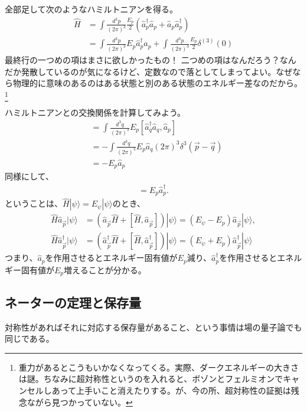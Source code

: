 \documentclass[10pt,a4paper]{jarticle}
\begin{document}
%
全部足して次のようなハミルトニアンを得る。
\begin{align}
\hat H
&= \int \frac{d^3 p}{(2\pi)^3} \frac{E_p}{2}( \hat a_p^\dagger \hat a_p + \hat a_p \hat a_p^\dagger ) \nonumber\\
&= \int \frac{d^3 p}{(2\pi)^3} E_p \hat a_p^\dagger \hat a_p + \int \frac{d^3 p}{(2\pi)^3} \frac{E_p}{2} \delta^{(3)}(0) \label{eq:spin 0 hamiltonian}
\end{align}
最終行の一つめの項はまさに欲しかったもの！
二つめの項はなんだろう？なんだか発散しているのが気になるけど、定数なので落としてしまってよい。なぜなら物理的に意味のあるのはある状態と別のある状態のエネルギー差なのだから。\footnote{
重力があるとこうもいかなくなってくる。実際、ダークエネルギーの大きさは謎。ちなみに超対称性というのを入れると、ボゾンとフェルミオンでキャンセルしあって上手いこと消えたりする。が、今の所、超対称性の証拠は残念ながら見つかっていない。}

ハミルトニアンとの交換関係を計算してみよう。
\begin{align}
[\hat H, \hat a_p]
&=\int \frac{d^3 q}{(2\pi)^3} E_p [\hat a_q^\dagger \hat a_q, \hat a_p] \nonumber\\
&=-\int \frac{d^3 q}{(2\pi)^3} E_p \hat a_q (2\pi)^3 \delta^3(\vec p - \vec q) \nonumber\\
&=-E_p \hat a_p
\end{align}
同様にして、
\begin{align}
[\hat H, \hat a_p^\dagger] = E_p \hat a_p^\dagger.
\end{align}
%
ということは、$\hat H |\psi \rangle = E_\psi |\psi\rangle$のとき、
\begin{align}
\hat H  \hat a_{\vec p} |\psi\rangle &= (\hat a_{\vec p} \hat H + [\hat H, \hat a_{\vec p}]) |\psi\rangle = (E_\psi - E_p)  \hat a_{\vec p} |\psi\rangle, \\
\hat H  \hat a_{\vec p}^\dagger |\psi\rangle &= (\hat a_{\vec p}^\dagger \hat H + [\hat H, \hat a_{\vec p}^\dagger]) |\psi\rangle = (E_\psi + E_p)  \hat a_{\vec p}^\dagger |\psi\rangle
\end{align}
つまり、$\hat a_p$を作用させるとエネルギー固有値が$E_p$減り、$\hat a_p^\dagger$を作用させるとエネルギー固有値が$E_p$増えることが分かる。

\subsection{ネーターの定理と保存量}
対称性があればそれに対応する保存量があること、という事情は場の量子論でも同じである。
\end{document}
